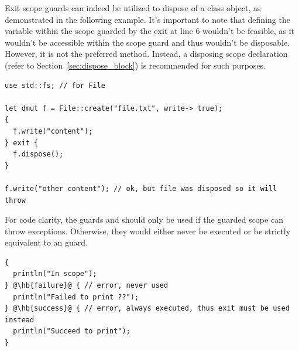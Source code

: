 Exit scope guards can indeed be utilized to dispose of a class object, as
demonstrated in the following example. It's important to note that defining the
variable  within the scope guarded by the exit at line 6 wouldn't be
feasible, as it wouldn't be accessible within the scope guard and thus wouldn't
be disposable. However, it is not the preferred method. Instead, a disposing
scope declaration (refer to Section~\ref{sec:dispose_block}) is recommended for
such purposes.

\begin{lstlisting}[style=coloredverbatim]
use std::fs; // for File

let dmut f = File::create("file.txt", write-> true);
{
  f.write("content");
} exit {
  f.dispose();
}

f.write("other content"); // ok, but file was disposed so it will throw
\end{lstlisting}

For code clarity, the guards  and  should only be
used if the guarded scope can throw exceptions. Otherwise, they would either
never be executed or be strictly equivalent to an  guard.

\begin{lstlisting}[style=coloredverbatimError, escapechar=@]
{
  println("In scope");
} @\hb{failure}@ { // error, never used
  println("Failed to print ??");
} @\hb{success}@ { // error, always executed, thus exit must be used instead
  println("Succeed to print");
}
\end{lstlisting}

\vfill%
\pagebreak
